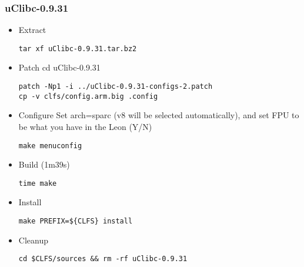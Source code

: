 \subsubsection{uClibc-0.9.31}
\begin{itemize}
  \item Extract
    \begin{lstlisting}
tar xf uClibc-0.9.31.tar.bz2
    \end{lstlisting}
  \item Patch cd uClibc-0.9.31
    \begin{lstlisting}
patch -Np1 -i ../uClibc-0.9.31-configs-2.patch
cp -v clfs/config.arm.big .config
    \end{lstlisting}
  \item Configure
Set arch=sparc (v8 will be selected automatically), and set FPU to be what you have in the Leon (Y/N)
   \begin{lstlisting}
make menuconfig
   \end{lstlisting}
  \item Build (1m39s)
    \begin{lstlisting}
time make
    \end{lstlisting}
  \item Install
    \begin{lstlisting}
make PREFIX=${CLFS} install
    \end{lstlisting}
  \item Cleanup
    \begin{lstlisting}
cd $CLFS/sources && rm -rf uClibc-0.9.31
    \end{lstlisting}
 \end{itemize}

